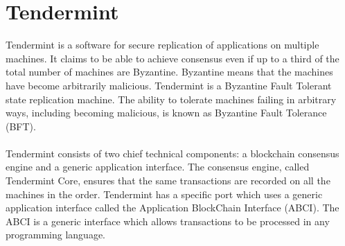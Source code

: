 \documentclass[a4paper,twoside,phd]{BYUPhys}
\begin{document}
\section{Tendermint}
Tendermint is a software for secure replication of applications on multiple machines\cite{TendermintTeam2018WhatDocumentation}. It claims to be able to achieve consensus even if up to a third of the total number of machines are Byzantine\cite{TendermintTeam2018WhatDocumentation}. Byzantine means that the machines have become arbitrarily malicious\cite{TendermintTeam2018WhatDocumentation}. Tendermint is a Byzantine Fault Tolerant state replication machine\cite{TendermintTeam2018WhatDocumentation}. The ability to tolerate machines failing in arbitrary ways, including becoming malicious, is known as Byzantine Fault Tolerance (BFT)\cite{TendermintTeam2018WhatDocumentation}.
\\
\\
Tendermint consists of two chief technical components: a blockchain consensus engine and a generic application interface\cite{TendermintTeam2018WhatDocumentation}. The consensus engine, called Tendermint Core, ensures that the same transactions are recorded on all the machines in the order\cite{}. Tendermint has a specific port which uses a generic application interface called the Application BlockChain Interface (ABCI)\cite{TendermintTeam2018WhatDocumentation}. The ABCI is a generic interface which allows transactions to be processed in any programming language\cite{TendermintTeam2018WhatDocumentation}. 
\end{document}
